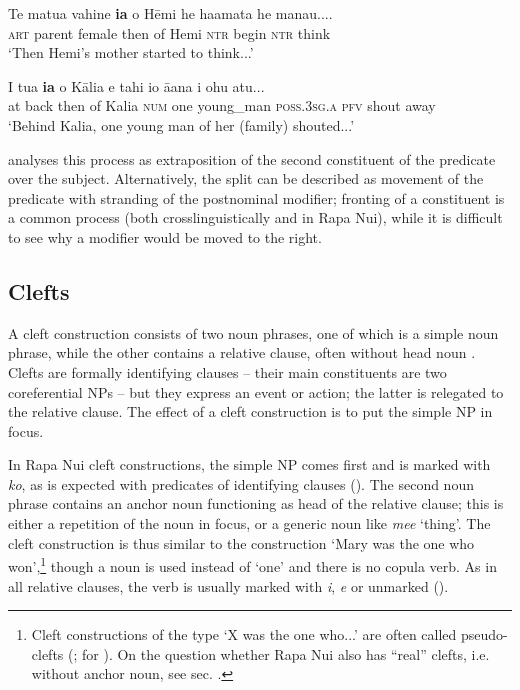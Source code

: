 \ea\label{ex:9.38}
\gll Te matu{\ꞌ}a vahine \textbf{ia} o Hēmi he ha{\ꞌ}amata he mana{\ꞌ}u.... \\
\textsc{art} parent female then of Hemi \textsc{ntr} begin \textsc{ntr} think \\

\glt 
‘Then Hemi’s mother started to think...’ \textstyleExampleref{[R476.042]} 
\z

\ea\label{ex:9.39}
\gll {\ꞌ}I tu{\ꞌ}a \textbf{ia} o Kālia e tahi io {\ꞌ}ā{\ꞌ}ana i ohu atu...\\
at back then of Kalia \textsc{num} one young\_man \textsc{poss.3sg.a} \textsc{pfv} shout away\\

\glt 
‘Behind Kalia, one young man of her (family) shouted...’ \textstyleExampleref{[R345.084]} 
\z

\citet[119–120]{Clark1976} analyses this process as extraposition of the second constituent of the predicate over the subject. Alternatively, the split can be described as movement of the predicate with stranding of the postnominal modifier; fronting of a constituent is a common process (both crosslinguistically and in Rapa Nui), while it is difficult to see why a modifier would be moved to the right.
\subsection{Clefts}\label{sec:9.2.6}
A cleft construction consists of two noun phrases, one of which is a simple noun phrase, while the other contains a relative clause, often without head noun \citep[278]{Payne1997}. Clefts are formally identifying clauses – their main constituents are two coreferential NPs – but they express an event or action; the latter is relegated to the relative clause. The effect of a cleft construction is to put the simple NP in focus.

In Rapa Nui cleft constructions, the simple NP comes first and is marked with \textit{ko}, as is expected with predicates of identifying clauses (). The second noun phrase contains an anchor noun functioning as head of the relative clause; this is either a repetition of the noun in focus, or a generic noun like \textit{me{\ꞌ}e} ‘thing’. The cleft construction is thus similar to the  construction ‘Mary was the one who won’,\footnote{\label{fn:468}Cleft constructions of the type ‘X was the one who...’ are often called pseudo-clefts (\citealt[279]{Payne1997}; \citealt[9]{Bauer1991} for ). On the question whether Rapa Nui also has “real” clefts, i.e. without anchor noun, see sec. .} though a noun is used instead of ‘one’ and there is no copula verb. As in all relative clauses, the verb is usually marked with \textit{i}, \textit{e} or unmarked ().

